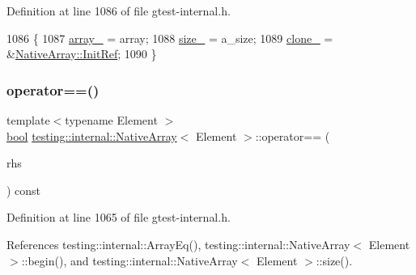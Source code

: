 Definition at line 1086 of file gtest-\/internal.\+h.


\begin{DoxyCode}
1086                                                     \{
1087     \hyperlink{classtesting_1_1internal_1_1NativeArray_adadc025fbbbd43904d4036991019f18f}{array\_} = array;
1088     \hyperlink{classtesting_1_1internal_1_1NativeArray_aa7e4251de39aaa75f697f0eaeedbf06e}{size\_} = a\_size;
1089     \hyperlink{classtesting_1_1internal_1_1NativeArray_addd7442a10398a60215a9989bcbd8078}{clone\_} = &\hyperlink{classtesting_1_1internal_1_1NativeArray_ac6ad6d79e17e2c98a9d4d684afcb7f79}{NativeArray::InitRef};
1090   \}
\end{DoxyCode}
\mbox{\label{classtesting_1_1internal_1_1NativeArray_a81b90f5739ed812610e68dc34c9e3850}} 
\subsubsection{\texorpdfstring{operator==()}{operator==()}}
{\footnotesize\ttfamily template$<$typename Element $>$ \\
\hyperlink{classbool}{bool} \hyperlink{classtesting_1_1internal_1_1NativeArray}{testing\+::internal\+::\+Native\+Array}$<$ Element $>$\+::operator== (\begin{DoxyParamCaption}\item[{const \hyperlink{classtesting_1_1internal_1_1NativeArray}{Native\+Array}$<$ Element $>$ \&}]{rhs }\end{DoxyParamCaption}) const\hspace{0.3cm}{\ttfamily [inline]}}



Definition at line 1065 of file gtest-\/internal.\+h.



References testing\+::internal\+::\+Array\+Eq(), testing\+::internal\+::\+Native\+Array$<$ Element $>$\+::begin(), and testing\+::internal\+::\+Native\+Array$<$ Element $>$\+::size().


